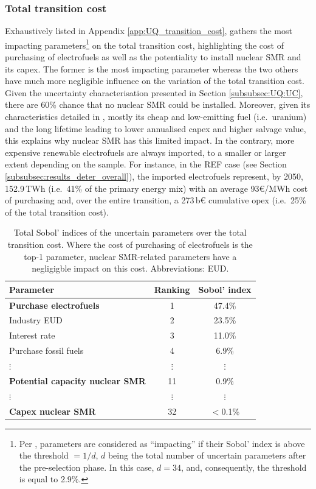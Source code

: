 \documentclass[11pt,twoside,a4paper,english]{article}
\def\ie{i.e.\ }
\begin{document}
\subsubsection{Total transition cost}
\label{subsubsec:results_uq_cost}
Exhaustively listed in Appendix \ref{app:UQ_transition_cost},  gathers the most impacting parameters\footnote{Per \citet{Turati2017}, parameters are considered as ``impacting'' if their Sobol' index is above the threshold $=1/d$, $d$ being the total number of uncertain parameters after the pre-selection phase. In this case, $d=34$, and, consequently, the threshold is equal to 2.9\%.} on the total transition cost, highlighting the cost of purchasing of electrofuels as well as the potentiality to install nuclear SMR and its capex. The former is the most impacting parameter whereas the two others have much more negligible influence on the variation of the total transition cost. Given the uncertainty characterisation presented in Section \ref{subsubsec:UQ:UC}, there are 60\% chance that no nuclear SMR could be installed. Moreover, given its characteristics detailed in , mostly its cheap and low-emitting fuel (\ie uranium) and the long lifetime leading to lower annualised capex and higher salvage value, this explains why nuclear SMR has this limited impact. In the contrary, more expensive renewable electrofuels are always imported, to a smaller or larger extent depending on the sample. For instance, in the REF case (see Section \ref{subsubsec:results_deter_overall}), the imported electrofuels represent, by 2050, 152.9\,TWh (\ie 41\% of the primary energy mix) with an average 93€/MWh cost of purchasing and, over the entire transition, a 273\,b€ cumulative opex (\ie 25\% of the total transition cost).

\begin{table}[htbp]
\caption{Total Sobol' indices of the uncertain parameters over the total transition cost. Where the cost of purchasing of electrofuels is the top-1 parameter, nuclear SMR-related parameters have a negligigble impact on this cost. Abbreviations: \acrfull{EUD}.}
\label{tab:UQ_short}
\centering
\begin{tabular}{l c c}
\toprule
\textbf{Parameter}  & \textbf{Ranking} & \textbf{Sobol' index} \\	
\midrule
\textbf{Purchase electrofuels} & 1 & 47.4\% \\
Industry EUD & 2 & 23.5\% \\
Interest rate & 3 & 11.0\% \\
Purchase fossil fuels  & 4 & 6.9\% \\
$\vdots$ & $\vdots$ & $\vdots$\\
\textbf{Potential capacity nuclear SMR} & 11 & 0.9\% \\
$\vdots$ & $\vdots$ & $\vdots$\\
\textbf{Capex nuclear SMR} & 32 & $<$0.1\% \\
\bottomrule							

\end{tabular}
\end{table}
\end{document}
